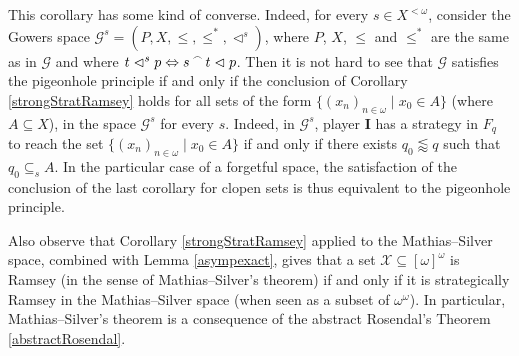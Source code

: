 \documentclass[a4paper,11pt]{article}
\theoremstyle{definition}
\numberwithin{equation}{section}
\newcommand{\X}{\mathcal{X}}
\newcommand{\elinf}{[\omega]^\omega}
\newcommand{\G}{\mathcal{G}}
\newcommand{\I}{\textbf{I}}
\newcommand{\II}{\textbf{II}}
\newcommand{\concat}{%
  \mathbin{\raisebox{1ex}{\scalebox{.7}{$\frown$}}}%
}
\begin{document}
This corollary has some kind of converse. Indeed, for every $s \in X^{< \omega}$, consider the Gowers space $\G^s = (P, X, \leqslant, \leqslant^*, \vartriangleleft^s)$, where $P$, $X$, $\leqslant$ and $\leqslant^*$ are the same as in $\G$ and where $t \vartriangleleft^s p \Leftrightarrow s \concat t \vartriangleleft p$. Then it is not hard to see that $\G$ satisfies the pigeonhole principle if and only if the conclusion of Corollary \ref{strongStratRamsey} holds for all sets of the form $\{(x_n)_{n \in \omega} \mid x_0 \in A\}$ (where $A \subseteq X$), in the space $\G^s$ for every $s$. Indeed, in $\G^s$, player \I{} has a strategy in $F_q$ to reach the set $\{(x_n)_{n \in \omega} \mid x_0 \in A\}$ if and only if there exists $q_0 \lessapprox q$ such that $q_0 \subseteq_s A$. In the particular case of a forgetful space, the satisfaction of the conclusion of the last corollary for clopen sets is thus equivalent to the pigeonhole principle.


\smallskip

Also observe that Corollary \ref{strongStratRamsey} applied to the Mathias--Silver space, combined with Lemma \ref{asympexact}, gives that a set $\X \subseteq \elinf$ is Ramsey (in the sense of Mathias--Silver's theorem) if and only if it is strategically Ramsey in the Mathias--Silver space (when seen as a subset of $\omega^\omega$). In particular, Mathias--Silver's theorem is a consequence of the abstract Rosendal's Theorem \ref{abstractRosendal}.
\end{document}
